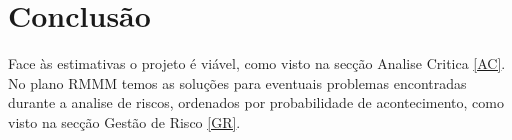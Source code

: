 \documentclass[a4paper]{report}
\begin{document}
\chapter{Conclusão}
Face às estimativas o projeto é viável, como visto na secção Analise Critica \ref{AC}. 
No plano RMMM temos as soluções para eventuais problemas encontradas durante a analise de riscos, ordenados por probabilidade de acontecimento, como visto na secção Gestão de Risco \ref{GR}.
\clearpage
{}

\end{document}
